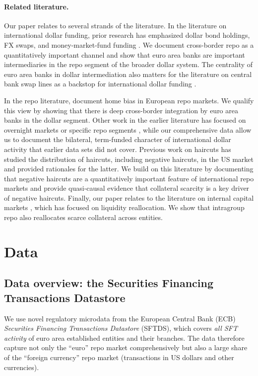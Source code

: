\documentclass[english, 12pt, oneside]{article}
\begin{document}
\paragraph{Related literature.} Our paper relates to several strands of the literature. In the literature on international dollar funding, prior research has emphasized dollar bond holdings, FX swaps, and money-market-fund funding \citep[e.g.,][]{ivashina2015, maggiori2020, aldasoro2022, shin2023, correa2025}. We document cross-border repo as a quantitatively important channel and show that euro area banks are important intermediaries in the repo segment of the broader dollar system. The centrality of euro area banks in dollar intermediation also matters for the literature on central bank swap lines as a backstop for international dollar funding \citep{bahaj2022, goldberg2022}.

In the repo literature, \citet{schaffner2019} document home bias in European repo markets. We qualify this view by showing that there is deep cross-border integration by euro area banks in the dollar segment. Other work in the earlier literature has focused on overnight markets or specific repo segments \citep[e.g.,][]{mancini2016, bechtel2023, huser2024}, while our comprehensive data allow us to document the bilateral, term-funded character of international dollar activity that earlier data sets did not cover. Previous work on haircuts \citep{infante2019, baklanova2019, hempel2023, julliard2022} has studied the distribution of haircuts, including negative haircuts, in the US market and provided rationales for the latter. We build on this literature by documenting that negative haircuts are a quantitatively important feature of international repo markets and provide quasi-causal evidence that collateral scarcity is a key driver of negative haircuts. Finally, our paper relates to the literature on internal capital markets \citep{cetorelli2012, hardy2024}, which has focused on liquidity reallocation. We show that intragroup repo also reallocates scarce collateral across entities.




\section{Data}
\label{section:data}
\subsection{Data overview: the Securities Financing Transactions Datastore}
We use novel regulatory microdata from the European Central Bank (ECB) \emph{Securities Financing Transactions Datastore} (SFTDS), which covers \emph{all SFT activity} of euro area established entities and their branches. The data therefore capture not only the ``euro'' repo market comprehensively but also a large share of the ``foreign currency'' repo market (transactions in US dollars and other currencies).
\end{document}
